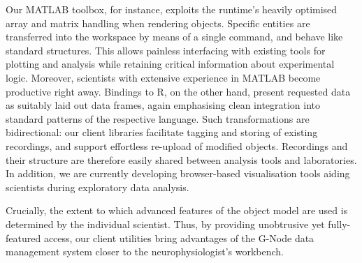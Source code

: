 \documentclass[a4paper]{article}
\begin{document}
Our MATLAB toolbox, for instance, exploits the runtime's heavily
optimised array and matrix handling when rendering objects. Specific
entities are transferred into the workspace by means of a single
command, and behave like standard structures. This allows painless
interfacing with existing tools for plotting and analysis while
retaining critical information about experimental logic. Moreover,
scientists with extensive experience in MATLAB become productive right
away. Bindings to R, on the other hand, present requested data as
suitably laid out data frames, again emphasising clean integration
into standard patterns of the respective language. Such
transformations are bidirectional: our client libraries facilitate
tagging and storing of existing recordings, and support effortless
re-upload of modified objects. Recordings and their structure are
therefore easily shared between analysis tools and laboratories. In
addition, we are currently developing browser-based visualisation
tools aiding scientists during exploratory data analysis.

Crucially, the extent to which advanced features of the object model
are used is determined by the individual scientist. Thus, by providing
unobtrusive yet fully-featured access, our client utilities bring
advantages of the G-Node data management system closer to the
neurophysiologist's workbench.
\end{document}
